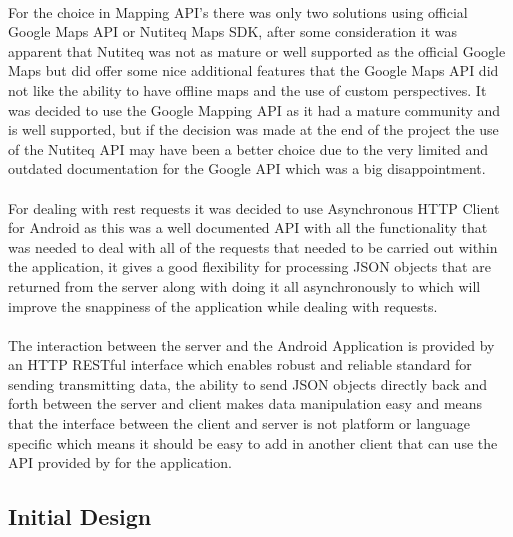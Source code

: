 \\
For the choice in Mapping API's there was only two solutions using official Google Maps API or Nutiteq Maps SDK, after some consideration it was apparent that Nutiteq was not as mature or well supported as the official Google Maps but did offer some nice additional features that the Google Maps API did not like the ability to have offline maps and the use of custom perspectives. It was decided to use the Google Mapping API as it had a mature community and is well supported, but if the decision was made at the end of the project the use of the Nutiteq API may have been a better choice due to the very limited and outdated documentation for the Google API which was a big disappointment.\\
\\
For dealing with rest requests it was decided to use Asynchronous HTTP Client for Android \cite{nknj:AndroidAsynchronousHttpClientloopjandthePersistentCookieStore:2013:online} as this was a well documented API with all the functionality that was needed to deal with all of the requests that needed to be carried out within the application, it gives a good flexibility for processing JSON objects that are returned from the server along with doing it all asynchronously to which will improve the snappiness of the application while dealing with requests.\\
\\
The interaction between the server and the Android Application is provided by an HTTP RESTful interface which enables robust and reliable standard for sending transmitting data, the ability to send JSON objects directly back and forth between the server and client makes data manipulation easy and means that the interface between the client and server is not platform or language specific which means it should be easy to add in another client that can use the API provided by for the application.

\subsection{Initial Design}

